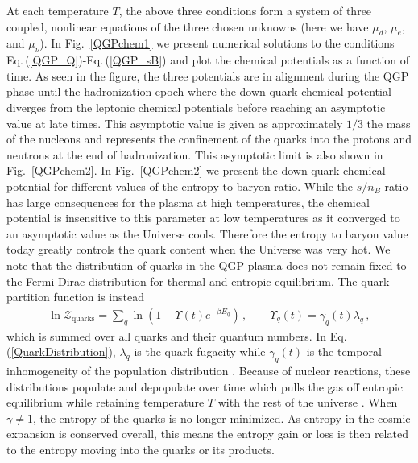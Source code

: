 \documentclass[universe,article,submit,moreauthors,pdftex,a4paper]{Definitions/mdpi}
\newcommand{\req}[1]{Eq.\,(\ref{#1})}
\newcommand*{\rf}[1]{Fig.~{\ref{#1}}}
\begin{document}
At each temperature $T$, the above three conditions form a system of three coupled, nonlinear equations of the three chosen unknowns (here we have $\mu_d$, $\mu_e$, and $\mu_\nu$). In \rf{QGPchem1} we present numerical solutions to the conditions \req{QGP_Q}-\req{QGP_sB} and plot the chemical potentials as a function of time. As seen in the figure, the three potentials are in alignment during the QGP phase until the hadronization epoch where the down quark chemical potential diverges from the leptonic chemical potentials before reaching an asymptotic value at late times. This asymptotic value is given as approximately $1/3$ the mass of the nucleons and represents the confinement of the quarks into the protons and neutrons at the end of hadronization. This asymptotic limit is also shown in \rf{QGPchem2}. In \rf{QGPchem2} we present the down quark chemical potential for different values of the entropy-to-baryon ratio. While the $s/n_{B}$ ratio has large consequences for the plasma at high temperatures, the chemical potential is insensitive to this parameter at low temperatures as it converged to an asymptotic value as the Universe cools. Therefore the entropy to baryon value today greatly controls the quark content when the Universe was very hot. We note that the distribution of quarks in the QGP plasma does not remain fixed to the Fermi-Dirac distribution for thermal and entropic equilibrium. The quark partition function is instead
\begin{align}
  \label{QuarkDistribution}\ln\mathcal{Z}_{\mathrm{quarks}}=\sum_{q}\ln\left(1+\Upsilon(t)e^{-\beta E_{q}}\right)\,,\qquad\Upsilon_{q}(t)=\gamma_{q}(t)\lambda_{q}\,,
\end{align}
which is summed over all quarks and their quantum numbers. In \req{QuarkDistribution}, $\lambda_{q}$ is the quark fugacity while $\gamma_{q}(t)$ is the temporal inhomogeneity of the population distribution \cite{Rafelski:2019twp}. Because of nuclear reactions, these distributions populate and depopulate over time which pulls the gas off entropic equilibrium while retaining temperature $T$ with the rest of the universe \cite{Letessier:2002gp}. When $\gamma\neq1$, the entropy of the quarks is no longer minimized. As entropy in the cosmic expansion is conserved overall, this means the entropy gain or loss is then related to the entropy moving into the quarks or its products.
\end{document}
